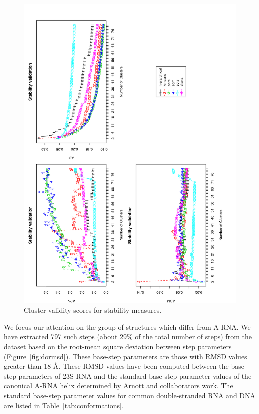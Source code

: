 \begin{figure}
 \centering
\includegraphics[angle=0, scale=0.38]{Chapter2/STval_sta.png}
\caption{Cluster validity scores for stability measures.}
 \label{fig:stability}
\end{figure}

We focus  our attention on the  group of structures  which differ from
A-RNA.  We have  extracted 797  such steps  (about 29\%  of  the total
number  of steps)  from  the  dataset based  on  the root-mean  square
deviation  between  step  parameters (Figure~\ref{fig:dormsd}).  These
base-step parameters are  those with RMSD values greater  than 18 \AA.
These RMSD values have  been computed between the base-step parameters
of  23S  RNA  and  the  standard base-step  parameter  values  of  the
canonical   A-RNA  helix  determined   by  Arnott   and  collaborators
\cite{arnott1973}  work. The standard  base-step parameter  values for
common    double-stranded    RNA     and    DNA    are    listed    in
Table~\ref{tab:conformations}.


